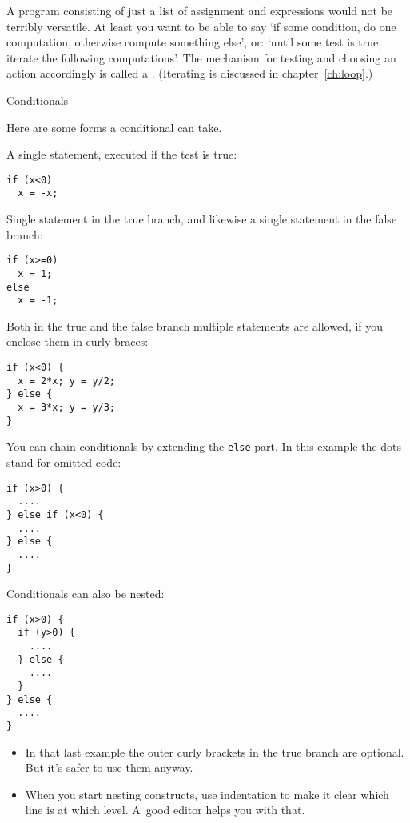
A program consisting of just a list of assignment and expressions
would not be terribly versatile. At least you want to be able to say
`if some condition, do one computation, otherwise compute something else',
or: `until some test is true, iterate the following computations'.
The mechanism for
testing and choosing an action accordingly is called a
.
(Iterating is discussed in chapter~\ref{ch:loop}.)

 {Conditionals}
\label{sec:if}

Here are some forms a conditional can take.

A single statement, executed if the test is true:
\begin{lstlisting}
if (x<0)
  x = -x;
\end{lstlisting}
Single statement in the true branch, and likewise a single
statement in the false branch:
\begin{lstlisting}
if (x>=0)
  x = 1;
else
  x = -1;
\end{lstlisting}
Both in the true and the false branch multiple statements are allowed,
if you enclose them in curly braces:
\begin{lstlisting}
if (x<0) {
  x = 2*x; y = y/2;
} else {
  x = 3*x; y = y/3;
}
\end{lstlisting}
You can chain conditionals by extending the \lstinline{else} part.
In this example the dots stand for omitted code:
\begin{lstlisting}
if (x>0) {
  ....
} else if (x<0) {
  ....
} else {
  ....
}
\end{lstlisting}
Conditionals can also be nested:
\begin{lstlisting}
if (x>0) {
  if (y>0) {
    ....
  } else {
    ....
  }
} else {
  ....
}
\end{lstlisting}
\begin{itemize}
\item
  In that last example the outer curly brackets in the true branch are
  optional. But it's safer to use them anyway.
\item When you start nesting constructs, use indentation to make it
  clear which line is at which level. A~good editor helps you with that.
\end{itemize}

